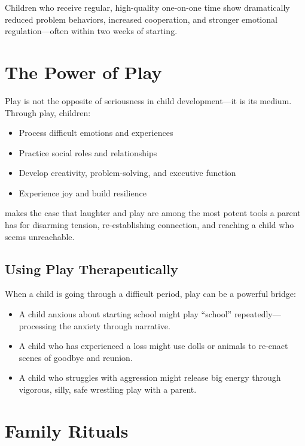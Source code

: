 \begin{keyinsight}
Children who receive regular, high-quality one-on-one time show
dramatically reduced problem behaviors, increased cooperation, and
stronger emotional regulation---often within two weeks of starting.
\end{keyinsight}

\section{The Power of Play}

Play is not the opposite of seriousness in child development---it is its
medium. Through play, children:

\begin{itemize}
  \item Process difficult emotions and experiences
  \item Practice social roles and relationships
  \item Develop creativity, problem-solving, and executive function
  \item Experience joy and build resilience
\end{itemize}

\citet{cohen2001} makes the case that
laughter and play are among the most potent tools a parent has for
disarming tension, re-establishing connection, and reaching a child who
seems unreachable.

\subsection{Using Play Therapeutically}

When a child is going through a difficult period, play can be a powerful
bridge:

\begin{itemize}
  \item A child anxious about starting school might play ``school''
        repeatedly---processing the anxiety through narrative.
  \item A child who has experienced a loss might use dolls or animals
        to re-enact scenes of goodbye and reunion.
  \item A child who struggles with aggression might release big energy
        through vigorous, silly, safe wrestling play with a parent.
\end{itemize}

\section{Family Rituals}

